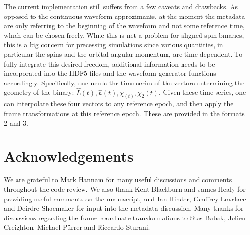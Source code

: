 \documentclass[11pt,tightenlines,article,amssymb,amsmath,amsfonts,superscriptaddress,nofootinbib]{revtex4}
\newcommand{\nNR}{\hat{n}}
\newcommand{\lNR}{\hat L}
\begin{document}
The current implementation still suffers from a few caveats and drawbacks. As opposed to the continuous waveform approximants, at the moment the metadata are only referring to the beginning of the waveform and not some reference time, which can be chosen freely. While this is not a problem for aligned-spin binaries, this is a big concern for precessing simulations since various quantities, in particular the spins and the orbital angular momentum, are time-dependent. To fully integrate this desired freedom, additional information needs to be incorporated into the HDF5 files and the waveform generator functions accordingly. Specifically, one needs the time-series of the vectors determining the geometry of the binary: $\lNR(t), \nNR(t), \chi_(t), \chi_2(t)$.  Given these time-series, one can interpolate these four vectors to any reference epoch, and then apply the frame transformations at this reference epoch. These are provided in the formats 2 and 3.

\section*{Acknowledgements}
We are grateful to Mark Hannam for many useful discussions and comments throughout the code review.
We also thank Kent Blackburn and James Healy for providing useful comments on the manuscript, and Ian Hinder, Geoffrey Lovelace and Deirdre Shoemaker for input into the metadata discussion.
Many thanks for discussions regarding the frame coordinate transformations to Stas Babak, Jolien Creighton, Michael P\"urrer and Riccardo Sturani.




\end{document}
